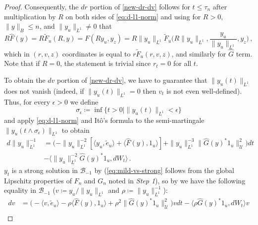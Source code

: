 \documentclass[final]{amsart}
\numberwithin{thm}{section}
\numberwithin{equation}{section}
\newcommand{\U}{\mathcal{U}}
\newcommand{\ip}[2]{\langle #1, #2 \rangle}
\newcommand{\B}{\mathcal{B}}
\begin{document}
\begin{proof}
    
    
    
    
    
    
    
    Consequently,  the $dr$ portion of \eqref{new-dr-dv} follows for $t \leq \tau_n$ after multiplication by $R$ on both sides of \eqref{eq:d-l1-norm} and
    using for $R > 0$, $\|y\|_B \leq n$, and $\|y_u\|_{L^1} \neq 0$ that
\begin{equation}
    R \hat{F}(y) = R\tilde F_u(R,y)= F(Ry_u,y_z) = R\|y_u\|_{L^1}\tilde{F}_u\Big(R\|y_u\|_{L^1}, 
     \frac{y_u}{\|y_u\|_{L^1}}, y_z \Big) \,, 
\end{equation}
which in $(r,v,z)$ coordinates is equal to $r\tilde F_u(r,v,z)$,
and similarly for $\hat{G}$ term. Note that if $R= 0$, the statement is trivial since $r_t = 0$ for all $t$. 
    
    To obtain the $dv$ portion of \eqref{new-dr-dv}, we have to guarantee that $\|y_u(t)\|_{L^1}$ does not vanish (indeed, if $\|y_u(t)\|_{L^1} = 0$ then $v_t$ is not even well-defined). Thus, for every $\epsilon > 0$
    we define
    \begin{equation}\label{eq:sigma-stopping-time}
        \sigma_\epsilon \coloneqq \inf\{t > 0 \mid \|y_u(t)\|_{L^1} < \epsilon\} 
    \end{equation}
    and apply \eqref{eq:d-l1-norm} and It\^{o}'s formula to the semi-martingale $\|y_u(t \wedge \sigma_\epsilon)\|_{L^1}$ to obtain
    \begin{equation*}
    \begin{aligned}
        d\|y_u\|_{L^1}^{-1} &= \Big(-\|y_u\|_{L^1}^{-2}[\ip{y_u}{\tilde e_u} + \ip{\hat F(y)}{1_u}] + \|y_u\|_{L^1}^{-3}\|\hat G(y)^*1_u\|_\U^2\Big)dt \\
        &- \ip{\|y_u\|_{L^1}^{-2}\hat G(y)^*1_u}{dW_t} \,.
    \end{aligned}
    \end{equation*}
    $y_t$ is a strong solution in $\B_{-1}$ by  (\eqref{eq:mild-vs-strong} follows from the global Lipschitz properties of $F_n$ and $G_n$ noted in \textit{Step 1}), so by \cite[Corollary 2.6]{ito-formula} we have the following equality in $\B_{-1}$ ($v \coloneqq y_u/\|y_u\|_{L^1}$ and $\rho \coloneqq \|y_u\|_{L^1}^{-1}$):
    \begin{equation}\label{eq:dv-for-y}
           \begin{aligned}
        dv &= \Big(-\ip{v}{\tilde e_u} - \rho\ip{\hat F(y)}{1_u} + \rho^2\|\hat G(y)^*1_u\|_\U^2\Big)vdt - \ip{\rho\hat G(y)^*1_u}{dW_t}v \\

\end{aligned}
\end{equation}
\end{proof}
\end{document}
